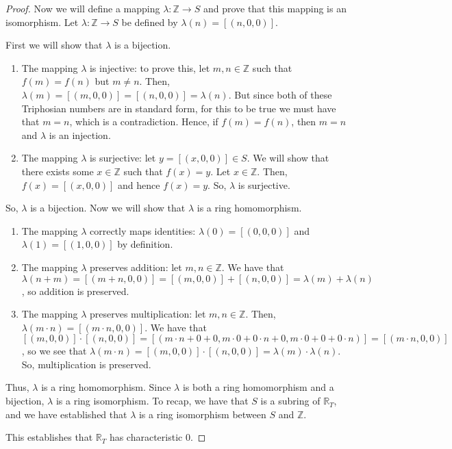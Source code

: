 \documentclass[11pt]{article}
\newcommand{\Tri}{\mathbb{R}_T}
\theoremstyle{definition}
\theoremstyle{plain}
\theoremstyle{remark}
\begin{document}
\begin{proof}
		Now we will define a mapping \(\lambda: \mathbb{Z} \to S\) and prove
		that this mapping is an isomorphism. Let \(\lambda: \mathbb{Z} \to S\)
		be defined by \(\lambda(n) = [(n,0,0)]\).

		First we will show that \(\lambda\) is a bijection.
		\begin{enumerate}
			\item The mapping \(\lambda\) is injective: to prove this, let
			\(m,n \in \mathbb{Z}\) such that \(f(m) = f(n)\) but \(m \neq n\).
			Then, \(\lambda(m) = [(m,0,0)] = [(n,0,0)] = \lambda(n)\). But
			since both of these Triphosian numbers are in standard form, for
			this to be true we must have that \(m = n\), which is a
			contradiction. Hence, if \(f(m) = f(n)\), then \(m=n\) and
			\(\lambda\) is an injection.
			\item The mapping \(\lambda\) is surjective: let \(y =[(x,0,0)] \in
			S\). We will show that there exists some \(x \in \mathbb{Z}\) such
			that \(f(x) = y\). Let \(x \in \mathbb{Z}\). Then, \(f(x) =
			[(x,0,0)]\) and hence \(f(x) = y\). So, \(\lambda\) is surjective.
		\end{enumerate}

		So, \(\lambda\) is a bijection. Now we will show that \(\lambda\) is a
		ring homomorphism.
		\begin{enumerate}
			\item The mapping \(\lambda\) correctly maps identities:
			\(\lambda(0) = [(0,0,0)]\) and \(\lambda(1) = [(1,0,0)]\) by
			definition.
			\item The mapping \(\lambda\) preserves addition: let \(m,n \in
			\mathbb{Z}\). We have that \(\lambda(n+m) = [(m+n,0,0)] = [(m,0,0)]
			+ [(n,0,0)] = \lambda(m) + \lambda(n)\), so addition is preserved.
			\item The mapping \(\lambda\) preserves multiplication: let \(m, n
			\in \mathbb{Z}\). Then, \(\lambda(m \cdot n) = [(m\cdot n, 0,0)].\)
			We have that \([(m,0,0)] \cdot [(n,0,0)] = [(m\cdot n + 0 + 0,
			m\cdot 0 + 0\cdot n + 0, m \cdot 0 + 0 + 0 \cdot n)] = [(m\cdot
			n,0,0)]\), so we see that \(\lambda(m\cdot n) = [(m,0,0)]\cdot
			[(n,0,0)] = \lambda(m) \cdot \lambda(n)\). So, multiplication is
			preserved.
		\end{enumerate}

		Thus, \(\lambda\) is a ring homomorphism. Since \(\lambda\) is both a
		ring homomorphism and a bijection, \(\lambda\) is a ring isomorphism.
		To recap, we have that \(S\) is a subring of \(\Tri\), and we have
		established that \(\lambda\) is a ring isomorphism between \(S\) and
		\(\mathbb{Z}\).

		This establishes that \(\Tri\) has characteristic 0.
	\end{proof}
\end{document}
